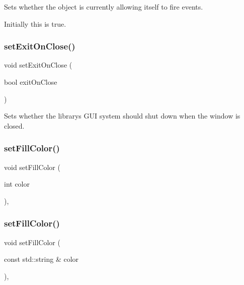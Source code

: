 Sets whether the object is currently allowing itself to fire events. 

Initially this is true. \mbox{\label{classGWindow_abad01a63e29c19aee274af1b36209838}} 
\subsubsection{\texorpdfstring{set\+Exit\+On\+Close()}{setExitOnClose()}}
{\footnotesize\ttfamily void set\+Exit\+On\+Close (\begin{DoxyParamCaption}\item[{bool}]{exit\+On\+Close }\end{DoxyParamCaption})\hspace{0.3cm}{\ttfamily [virtual]}}



Sets whether the library\textquotesingle{}s G\+UI system should shut down when the window is closed. 

\mbox{\label{classGForwardDrawingSurface_a2ba4c9792d4f01f4d2fbcfe0c17c8957}} 
\subsubsection{\texorpdfstring{set\+Fill\+Color()}{setFillColor()}\hspace{0.1cm}{\footnotesize\ttfamily [1/2]}}
{\footnotesize\ttfamily void set\+Fill\+Color (\begin{DoxyParamCaption}\item[{int}]{color }\end{DoxyParamCaption})\hspace{0.3cm}{\ttfamily [override]}, {\ttfamily [inherited]}}

\mbox{\label{classGForwardDrawingSurface_a70b93179159e497a6656574a3b2e1dbd}} 
\subsubsection{\texorpdfstring{set\+Fill\+Color()}{setFillColor()}\hspace{0.1cm}{\footnotesize\ttfamily [2/2]}}
{\footnotesize\ttfamily void set\+Fill\+Color (\begin{DoxyParamCaption}\item[{const std\+::string \&}]{color }\end{DoxyParamCaption})\hspace{0.3cm}{\ttfamily [override]}, {\ttfamily [inherited]}}

